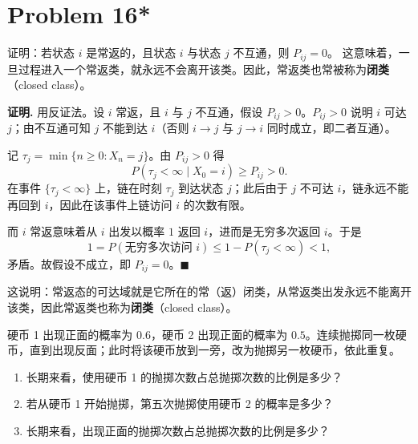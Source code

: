 \documentclass[12pt,a4paper]{article}
\begin{document}
\section{Problem 16*}

证明：若状态 $i$ 是常返的，且状态 $i$ 与状态 $j$ 不互通，则 $P_{ij}=0$。
这意味着，一旦过程进入一个常返类，就永远不会离开该类。因此，常返类也常被称为\textbf{闭类}（closed class）。

\begin{answerbox}
\textbf{证明.}
用反证法。设 $i$ 常返，且 $i$ 与 $j$ 不互通，假设 $P_{ij}>0$。$P_{ij}>0$ 说明 $i$ 可达 $j$；由不互通可知 $j$ 不能到达 $i$（否则 $i\to j$ 与 $j\to i$ 同时成立，即二者互通）。

记 $\tau_j=\min\{n\ge0:X_n=j\}$。由 $P_{ij}>0$ 得
\[
P(\tau_j<\infty\mid X_0=i)\ge P_{ij}>0 .
\]
在事件 $\{\tau_j<\infty\}$ 上，链在时刻 $\tau_j$ 到达状态 $j$；此后由于 $j$ 不可达 $i$，链永远不能再回到 $i$，因此在该事件上链访问 $i$ 的次数有限。

而 $i$ 常返意味着从 $i$ 出发以概率 $1$ 返回 $i$，进而是无穷多次返回 $i$。于是
\[
1=P(\text{无穷多次访问 }i)\le 1-P(\tau_j<\infty)<1,
\]
矛盾。故假设不成立，即 $P_{ij}=0$。$\blacksquare$

这说明：常返态的可达域就是它所在的常（返）闭类，从常返类出发永远不能离开该类，因此常返类也称为\textbf{闭类}（closed class）。
\end{answerbox}

硬币 1 出现正面的概率为 $0.6$，硬币 2 出现正面的概率为 $0.5$。连续抛掷同一枚硬币，直到出现反面；此时将该硬币放到一旁，改为抛掷另一枚硬币，依此重复。
\begin{enumerate}[label=(\alph*),leftmargin=2em,itemsep=4pt]
\item 长期来看，使用硬币 1 的抛掷次数占总抛掷次数的比例是多少？
\item 若从硬币 1 开始抛掷，第五次抛掷使用硬币 2 的概率是多少？
\item 长期来看，出现正面的抛掷次数占总抛掷次数的比例是多少？
\end{enumerate}
\end{document}
